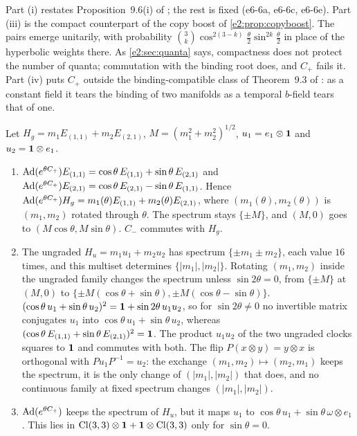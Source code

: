 Part (i) restates Proposition~9.6(i) of \cite{RE}; the rest is fixed (e6-6a, e6-6c, e6-6e). Part (iii) is the compact counterpart of the copy boost
of \cref{e2:prop:copyboost}. The pairs emerge unitarily, with probability $\binom3k\cos^{2(3-k)}\tfrac\theta2\sin^{2k}\tfrac\theta2$ in place of the hyperbolic
weights there. As \cref{e2:sec:quanta} says, compactness does not protect the number of quanta; commutation with the binding root does, and $C_+$
fails it. Part (iv) puts $C_+$ outside the binding-compatible class of Theorem~9.3 of \cite{RE}: as a constant field it tears the binding of two
manifolds as a temporal $b$-field tears that of one.

\begin{proposition}
\label{e6:prop:transfer}
Let $H_g=m_1E_{(1,1)}+m_2E_{(2,1)}$, $M=(m_1^2+m_2^2)^{1/2}$, $u_1=e_1\otimes\mathbf 1$ and $u_2=\mathbf 1\otimes e_1$.
\begin{enumerate}[label=(\roman*),leftmargin=2.2em]
\item $\operatorname{Ad}(e^{\theta C_+})E_{(1,1)}=\cos\theta\,E_{(1,1)}+\sin\theta\,E_{(2,1)}$ and $\operatorname{Ad}(e^{\theta C_+})E_{(2,1)}=\cos\theta\,E_{(2,1)}-\sin\theta\,E_{(1,1)}$. Hence
$\operatorname{Ad}(e^{\theta C_+})H_g=m_1(\theta)E_{(1,1)}+m_2(\theta)E_{(2,1)}$, where $(m_1(\theta),m_2(\theta))$ is $(m_1,m_2)$ rotated through $\theta$. The spectrum stays $\{\pm M\}$, and
$(M,0)$ goes to $(M\cos\theta,M\sin\theta)$. $C_-$ commutes with $H_g$.
\item The ungraded $H_u=m_1u_1+m_2u_2$ has spectrum $\{\pm m_1\pm m_2\}$, each value $16$ times, and this multiset determines $\{|m_1|,|m_2|\}$. Rotating
$(m_1,m_2)$ inside the ungraded family changes the spectrum unless $\sin2\theta=0$, from $\{\pm M\}$ at $(M,0)$ to $\{\pm M(\cos\theta+\sin\theta),\pm M(\cos\theta-\sin\theta)\}$.
$(\cos\theta\,u_1+\sin\theta\,u_2)^2=\mathbf 1+\sin2\theta\,u_1u_2$, so for $\sin2\theta\neq0$ no invertible matrix conjugates $u_1$ into $\cos\theta\,u_1+\sin\theta\,u_2$,
whereas $(\cos\theta\,E_{(1,1)}+\sin\theta\,E_{(2,1)})^2=\mathbf 1$. The product $u_1u_2$ of the two ungraded clocks squares to $\mathbf 1$ and commutes with both. The flip $P(x\otimes y)=y\otimes x$ is orthogonal with
$Pu_1P^{-1}=u_2$: the exchange $(m_1,m_2)\mapsto(m_2,m_1)$ keeps the spectrum, it is the only change of $(|m_1|,|m_2|)$ that does, and no continuous
family at fixed spectrum changes $(|m_1|,|m_2|)$.
\item $\operatorname{Ad}(e^{\theta C_+})$ keeps the spectrum of $H_u$, but it maps $u_1$ to $\cos\theta\,u_1+\sin\theta\,\omega\otimes e_1$. This lies in
$\mathrm{Cl}(3,3)\otimes\mathbf 1+\mathbf 1\otimes\mathrm{Cl}(3,3)$ only for $\sin\theta=0$.
\end{enumerate}
\end{proposition}

